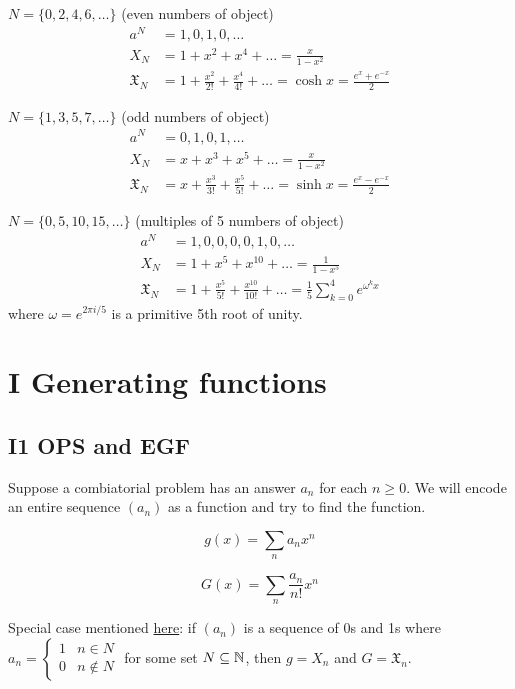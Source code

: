 \documentclass[12pt]{article}
\begin{document}
\eg $N=\{0,2,4,6,\dots\}$ \hfill(even numbers of object)\begin{align*}
    a^N &= 1,0,1,0,\dots\\
    X_N &= 1+x^2 +x^4+\dots = \frac{x}{1-x^2}\\
    \mathfrak{X}_N &= 1+\frac{x^2}{2!}+\frac{x^4}{4!}+\dots = \cosh x = \frac{e^x+e^{-x}}{2}
\end{align*}

\eg $N=\{1,3,5,7,\dots\}$ \hfill(odd numbers of object)\begin{align*}
    a^N &= 0,1,0,1,\dots\\
    X_N &= x+x^3 +x^5+\dots = \frac{x}{1-x^2}\\
    \mathfrak{X}_N &= x+\frac{x^3}{3!}+\frac{x^5}{5!}+\dots = \sinh x = \frac{e^x-e^{-x}}{2}
\end{align*}

\eg $N=\{0,5,10,15,\dots\}$ \hfill(multiples of 5 numbers of object)\begin{align*}
    a^N &= 1,0,0,0,0,1,0,\dots\\
    X_N &= 1+x^5 +x^10+\dots = \frac{1}{1-x^5}\\
    \mathfrak{X}_N &= 1+\frac{x^5}{5!}+\frac{x^{10}}{10!}+\dots = \frac{1}{5}\sum_{k=0}^{4}e^{\omega^k x}
\end{align*}
where $\omega=e^{2\pi i/5}$ is a primitive 5th root of unity.

\section{I Generating functions}
\subsection{I1 OPS and EGF}
Suppose a combiatorial problem has an answer $a_n$ for each $n\geq 0$. We will encode an entire sequence $(a_n)$ as a function and try to find the function.

 \[g(x)=\sum_n a_nx^n\]

\[G(x)=\sum_n \frac{a_n}{n!}x^n\]

\rmk Special case mentioned \hyperlink{characteristic-ops-egf}{here}: if $(a_n)$ is a sequence of 0s and 1s where $a_n=\begin{cases}
    1 & n\in N\\
    0 & n\notin N
\end{cases}$ for some set $N\subseteq\mathbb{N}$, then $g=X_n$ and $G=\mathfrak{X}_n$.
\end{document}
